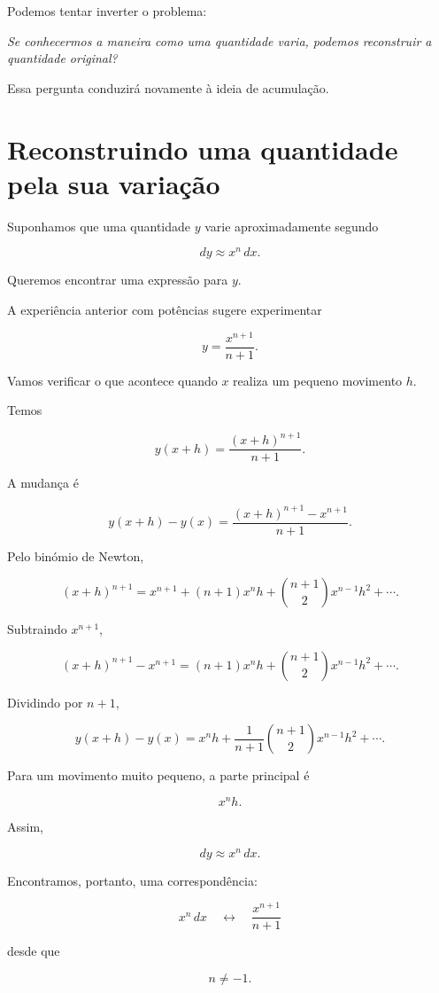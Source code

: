 \documentclass[12pt,a4paper]{article}
\begin{document}
Podemos tentar inverter o problema:

\begin{center}
\emph{Se conhecermos a maneira como uma quantidade varia, podemos
reconstruir a quantidade original?}
\end{center}

Essa pergunta conduzirá novamente à ideia de acumulação.

\section{Reconstruindo uma quantidade pela sua variação}

Suponhamos que uma quantidade \(y\) varie aproximadamente segundo

\[
dy\approx x^n\,dx.
\]

Queremos encontrar uma expressão para \(y\).

A experiência anterior com potências sugere experimentar

\[
y=\frac{x^{n+1}}{n+1}.
\]

Vamos verificar o que acontece quando \(x\) realiza um pequeno movimento
\(h\).

Temos

\[
y(x+h)
=
\frac{(x+h)^{n+1}}{n+1}.
\]

A mudança é

\[
y(x+h)-y(x)
=
\frac{(x+h)^{n+1}-x^{n+1}}{n+1}.
\]

Pelo binómio de Newton,

\[
(x+h)^{n+1}
=
x^{n+1}
+
(n+1)x^nh
+
\binom{n+1}{2}x^{n-1}h^2
+\cdots.
\]

Subtraindo \(x^{n+1}\),

\[
(x+h)^{n+1}-x^{n+1}
=
(n+1)x^nh
+
\binom{n+1}{2}x^{n-1}h^2
+\cdots.
\]

Dividindo por \(n+1\),

\[
y(x+h)-y(x)
=
x^nh
+
\frac{1}{n+1}
\binom{n+1}{2}x^{n-1}h^2
+\cdots.
\]

Para um movimento muito pequeno, a parte principal é

\[
x^nh.
\]

Assim,

\[
dy\approx x^n\,dx.
\]

Encontramos, portanto, uma correspondência:

\[
\boxed{
x^n\,dx
\quad\longleftrightarrow\quad
\frac{x^{n+1}}{n+1}
}
\]

desde que

\[
n\neq -1.
\]
\end{document}
